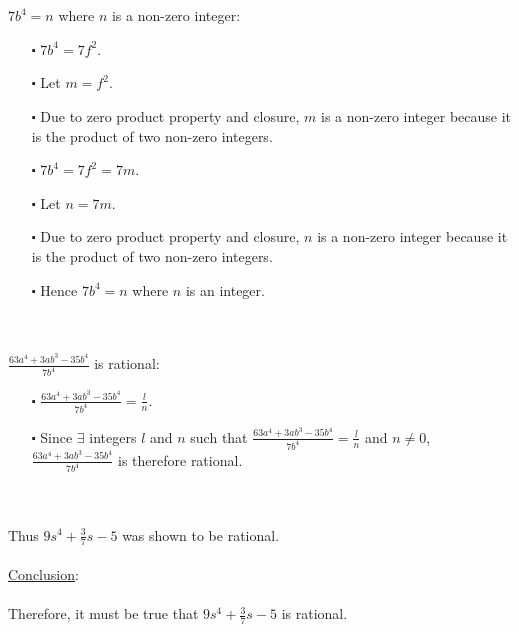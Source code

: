\documentclass[12pt]{article}
\begin{document}
\newblock
\\ \\
$7b^4 = n$ where $n$ is a non-zero integer:
\begin{itemize}
  \item [$\centerdot$] $7b^4 = 7f^2$.
  \item [$\centerdot$] Let $m = f^2$.
  \item [$\centerdot$] Due to zero product property and closure, $m$ is a non-zero integer because it is the product of two non-zero integers.
  \item [$\centerdot$] $7b^4 = 7f^2 = 7m$.
  \item [$\centerdot$] Let $n = 7m$.
  \item [$\centerdot$] Due to zero product property and closure, $n$ is a non-zero integer because it is the product of two non-zero integers.
  \item [$\centerdot$] Hence $7b^4 = n$ where $n$ is an integer.
\end{itemize}
\newblock
\\ \\
$\frac{63a^4 + 3ab^3 - 35b^4}{7b^4}$ is rational:
\begin{itemize}
  \item [$\centerdot$] $\frac{63a^4 + 3ab^3 - 35b^4}{7b^4} = \frac{l}{n}$.
  \item [$\centerdot$] Since $\exists$ integers $l$ and $n$ such that $\frac{63a^4 + 3ab^3 - 35b^4}{7b^4} = \frac{l}{n}$
  and $n \neq 0$, $\frac{63a^4 + 3ab^3 - 35b^4}{7b^4}$ is therefore rational. 
\end{itemize}
\newblock
\\ \\
Thus $9s^4 + \frac{3}{7}s -5$ was shown to be rational. \\ \\
\underline{Conclusion}:
\\ \\
Therefore, it must be true that $9s^4 + \frac{3}{7}s -5$ is rational.
\end{document}

